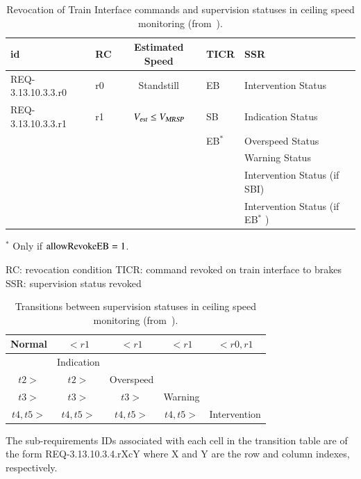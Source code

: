 \begin{table}[htbp]
\caption{Revocation of Train Interface commands and supervision
  statuses in ceiling speed monitoring
  (from~\cite[Table~6]{ETCSSRS-Principles}).}

\tabsize
\begin{minipage}{\textwidth}
\centering
\begin{tabular}{llcll}
\hline\hline
{\bf id} & {\bf RC} & {\bf Estimated Speed} & {\bf TICR} & {\bf SSR}
\\\hline
REQ-3.13.10.3.3.r0 & r0 & Standstill & EB & Intervention Status
\\
REQ-3.13.10.3.3.r1 & r1 & ${V_{\text{\sl est}}} \le {V_{\text{\sl MRSP}}}$ & SB  &
Indication Status \\
& & & EB$^*$ &
Overspeed Status\\
& & &  &
Warning Status \\
& & &  &
Intervention Status (if SBI) \\
& & &  &
Intervention Status (if EB$^*$ )\\
\hline\hline
\end{tabular}
\end{minipage}

$^*$ Only if $\text{allowRevokeEB} = 1$.
\normalsize

RC: revocation condition \newline
TICR: command revoked on train interface to brakes \newline
SSR: supervision status revoked

\normalsize
\label{tab:six}
\end{table}%



\begin{table}[htbp]
\caption{Transitions between supervision statuses in ceiling speed
  monitoring (from~\cite[Table~7]{ETCSSRS-Principles}).}
\begin{center}
\begin{tabular}{|c|c|c|c|c|}
\hline
Normal  &   $< r1$ &   $< r1$ &   $< r1$ & $< r0,r1$
\\\hline
    &    Indication  & & & 
 \\\hline
    $t2 >$ &    $t2 > $ &   Overspeed  & & 
 \\\hline
    $t3 >$ &     $t3 >$ &    $t3 >$ &   Warning  &
 \\\hline
    $t4,t5 >$ &     $t4,t5 >$ &   $t4,t5 >$ &   $t4,t5 >$ &   Intervention
\\\hline
\end{tabular}
\end{center}


\smallskip
\footnotesize
 The
  sub-requirements IDs associated with each cell in the transition table
   are of the form  REQ-3.13.10.3.4.rXcY where X and Y
  are the row and   column indexes, respectively. 
\normalsize
\label{tab:seven}
\end{table}%

